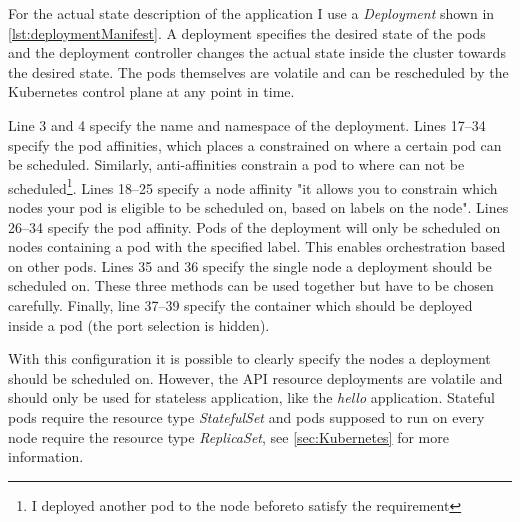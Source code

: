 For the actual state description of the application I use a \textit{Deployment} shown in \cref{lst:deploymentManifest}. A deployment specifies the desired state of the pods and the deployment controller changes the actual state inside the cluster towards the desired state. The pods themselves are volatile and can be rescheduled by the Kubernetes control plane at any point in time. 

Line 3 and 4 specify the name and namespace of the deployment. Lines 17--34 specify the pod affinities, which places a constrained on where a certain pod can be scheduled. Similarly, anti-affinities constrain a pod to where can not be scheduled\footnote{I deployed another pod to the node beforeto satisfy the requirement}. Lines 18--25 specify a node affinity "it allows you to constrain which nodes your pod is eligible to be scheduled on, based on labels on the node"\cite{affinitiesKubernetes:online}.
Lines 26--34 specify the pod affinity. Pods of the deployment will only be scheduled on nodes containing a pod with the specified label. This enables orchestration based on other pods. Lines 35 and 36 specify the single node a deployment should be scheduled on. These three methods can be used together but have to be chosen carefully. Finally, line 37--39 specify the container which should be deployed inside a pod (the port selection is hidden).

With this configuration it is possible to clearly specify the nodes a deployment should be scheduled on. However, the API resource deployments are volatile and should only be used for stateless application, like the \textit{hello} application. Stateful pods require the resource type \textit{StatefulSet} and pods supposed to run on every node require the resource type \textit{ReplicaSet}, see \cref{sec:Kubernetes} for more information.
